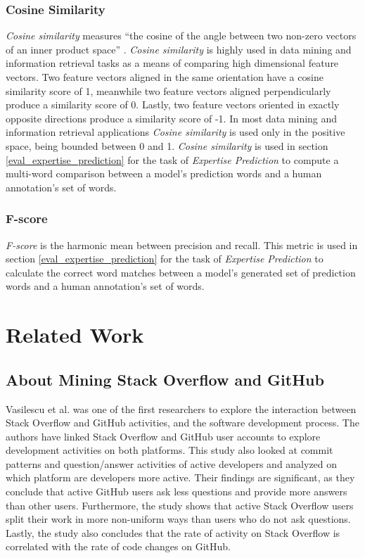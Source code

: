         \subsubsection{Cosine Similarity}
            \emph{Cosine similarity} measures ``the cosine of the angle between two non-zero vectors of an inner product space'' \cite{cosSim_def}. \emph{Cosine similarity} is highly used in data mining and information retrieval tasks as a means of comparing high dimensional feature vectors. Two feature vectors aligned in the same orientation have a cosine similarity score of 1, meanwhile two feature vectors aligned perpendicularly produce a similarity score of 0. Lastly, two feature vectors oriented in exactly opposite directions produce a similarity score of -1. In most data mining and information retrieval applications \emph{Cosine similarity} is used only in the positive space, being bounded between 0 and 1. \emph{Cosine similarity} is used in section \ref{eval_expertise_prediction} for the task of \emph{Expertise Prediction} to compute a multi-word comparison between a model's prediction words and a human annotation's set of words.
            
        \subsubsection{F-score}
            \emph{F-score} is the harmonic mean between precision and recall. This metric is used in section \ref{eval_expertise_prediction} for the task of \emph{Expertise Prediction} to calculate the correct word matches between a model's generated set of prediction words and a human annotation's set of words.
            

\section{Related Work}

    \subsection{About Mining Stack Overflow and GitHub}
        Vasilescu et al. \cite{vasilescu2013stackoverflow} was one of the first researchers to explore the interaction between Stack Overflow and GitHub activities, and the software development process. The authors have linked Stack Overflow and GitHub user accounts to explore development activities on both platforms. This study also looked at commit patterns and question/answer activities of active developers and analyzed on which platform are developers more active. Their findings are significant, as they conclude that active GitHub users ask less questions and provide more answers than other users. Furthermore, the study shows that active Stack Overflow users split their work in more non-uniform ways than users who do not ask questions. Lastly, the study also concludes that the rate of activity on Stack Overflow is correlated with the rate of code changes on GitHub.
        
